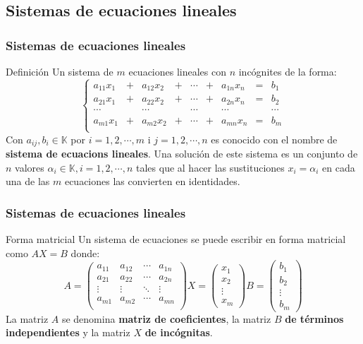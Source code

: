 \documentclass[aspectratio=169]{beamer}
\begin{document}
  \subsection{Sistemas de ecuaciones lineales}
         \begin{frame}
    \frametitle{Sistemas de ecuaciones lineales}
       \begin{block}{Definici\'on}
Un sistema de $m$ ecuaciones lineales con $n$ inc\'ognites de la forma:
\[\left\{\begin{array}{ccccccccc}
a_{11}x_1 & + & a_{12}x_2 & + & \cdots & + & a_{1n}x_n & = & b_1\\
a_{21}x_1 & + & a_{22}x_2 & + & \cdots & + & a_{2n}x_n & = & b_2\\
\cdots &  & \cdots &  & \cdots &  & \cdots &  & \cdots\\
a_{m1}x_1 & + & a_{m2}x_2 & + & \cdots & + & a_{mn}x_n & = & b_m\\
\end{array}\right.\]
Con $a_{ij}, b_i\in \mathbb{K}$ por $i=1,2,\cdots,m$ i $j=1,2,\cdots,n$ es conocido con el nombre de \textbf{sistema de ecuacions lineales}. Una soluci\'on de este sistema es un conjunto de $n$ valores $\alpha_i\in \mathbb{K}, i=1,2,\cdots,n$ tales que al hacer las sustituciones $x_i=\alpha_i$ en cada una de las $m$ ecuaciones las convierten en identidades.
\end{block}
  \end{frame} 
  
  
  
           \begin{frame}
    \frametitle{Sistemas de ecuaciones lineales}
       \begin{block}{Forma matricial}
Un sistema de ecuaciones se puede escribir en forma matricial como $AX=B$ donde: 
\[A=\left(\begin{array}{cccc}
a_{11} & a_{12}  & \cdots  & a_{1n} \\
a_{21} & a_{22}  & \cdots  & a_{2n} \\
\vdots &  \vdots & \ddots  & \vdots \\
a_{m1} & a_{m2} & \cdots &  a_{mn}\\
\end{array}\right)
X=\left(\begin{array}{c}
x_1 \\x_2\\\vdots \\x_m
\end{array}\right)
B=\left(\begin{array}{c}
b_1 \\b_2\\\vdots \\b_m
\end{array}\right)
\]
La matriz $A$ se denomina \textbf{matriz de coeficientes}, la matriz $B$ \textbf{de t\'erminos independientes} y la matriz $X$ \textbf{de inc\'ognitas}.

\end{block}
  \end{frame} 
  
\end{document}
